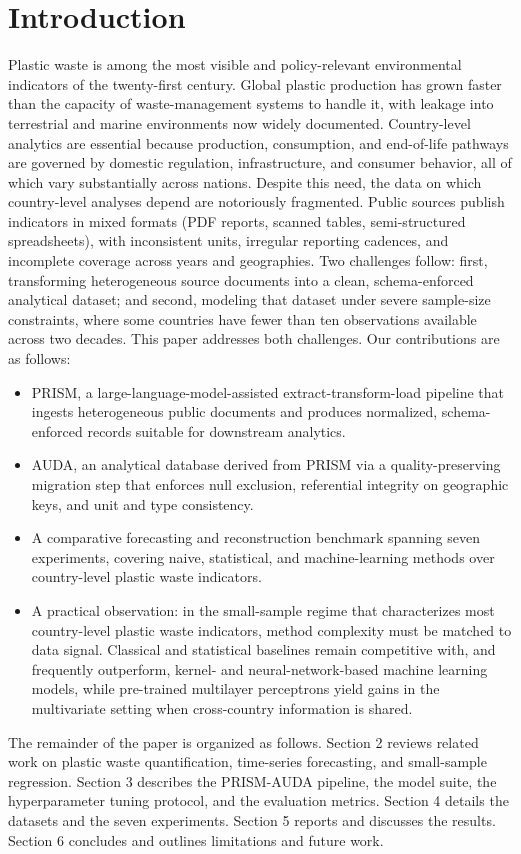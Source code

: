 \section{Introduction}

Plastic waste is among the most visible and policy-relevant environmental indicators of the twenty-first century. Global plastic production has grown faster than the capacity of waste-management systems to handle it, with leakage into terrestrial and marine environments now widely documented. Country-level analytics are essential because production, consumption, and end-of-life pathways are governed by domestic regulation, infrastructure, and consumer behavior, all of which vary substantially across nations.
Despite this need, the data on which country-level analyses depend are notoriously fragmented. Public sources publish indicators in mixed formats (PDF reports, scanned tables, semi-structured spreadsheets), with inconsistent units, irregular reporting cadences, and incomplete coverage across years and geographies. Two challenges follow: first, transforming heterogeneous source documents into a clean, schema-enforced analytical dataset; and second, modeling that dataset under severe sample-size constraints, where some countries have fewer than ten observations available across two decades.
This paper addresses both challenges. Our contributions are as follows:
\begin{itemize}
	\item {
	      PRISM, a large-language-model-assisted extract-transform-load pipeline that ingests heterogeneous public documents and produces normalized, schema-enforced records suitable for downstream analytics.
	      }
	\item {
	      AUDA, an analytical database derived from PRISM via a quality-preserving migration step that enforces null exclusion, referential integrity on geographic keys, and unit and type consistency.
	      }
	\item {
	      A comparative forecasting and reconstruction benchmark spanning seven experiments, covering naive, statistical, and machine-learning methods over country-level plastic waste indicators.
	      }
	\item {
	      A practical observation: in the small-sample regime that characterizes most country-level plastic waste indicators, method complexity must be matched to data signal. Classical and statistical baselines remain competitive with, and frequently outperform, kernel- and neural-network-based machine learning models, while pre-trained multilayer perceptrons yield gains in the multivariate setting when cross-country information is shared.
	      }
\end{itemize}

The remainder of the paper is organized as follows. Section 2 reviews related work on plastic waste quantification, time-series forecasting, and small-sample regression. Section 3 describes the PRISM-AUDA pipeline, the model suite, the hyperparameter tuning protocol, and the evaluation metrics. Section 4 details the datasets and the seven experiments. Section 5 reports and discusses the results. Section 6 concludes and outlines limitations and future work.

